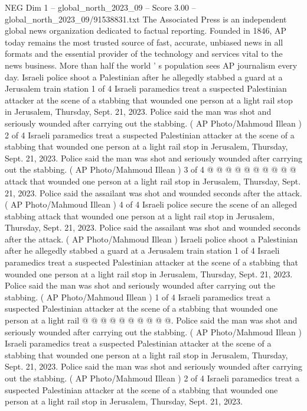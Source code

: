 \begin{textsample}{NEG Dim 1 – global\_north\_2023\_09 – Score 3.00 – global\_north\_2023\_09/91538831.txt}  \label{ex:f1_neg_346}
The Associated Press is an independent global news organization dedicated to factual reporting.
Founded in 1846, AP today remains the most trusted source of fast, accurate, unbiased news in all formats and the essential provider of the technology and services vital to the news business.
More than half the world ' s population sees AP journalism every day.
Israeli police shoot a Palestinian after he allegedly stabbed a guard at a Jerusalem train station 1 of 4 Israeli paramedics treat a suspected Palestinian attacker at the scene of a stabbing that wounded one person at a light rail stop in Jerusalem, Thursday, Sept. 21, 2023.
Police said the man was shot and seriously wounded after carrying out the stabbing. ( AP Photo/Mahmoud Illean ) 2 of 4 Israeli paramedics treat a suspected Palestinian attacker at the scene of a stabbing that wounded one person at a light rail stop in Jerusalem, Thursday, Sept. 21, 2023.
Police said the man was shot and seriously wounded after carrying out the stabbing. ( AP Photo/Mahmoud Illean ) 3 of 4 @ @ @ @ @ @ @ @ @ @ attack that wounded one person at a light rail stop in Jerusalem, Thursday, Sept. 21, 2023.
Police said the assailant was shot and wounded seconds after the attack. ( AP Photo/Mahmoud Illean ) 4 of 4 Israeli police secure the scene of an alleged stabbing attack that wounded one person at a light rail stop in Jerusalem, Thursday, Sept. 21, 2023.
Police said the assailant was shot and wounded seconds after the attack. ( AP Photo/Mahmoud Illean ) Israeli police shoot a Palestinian after he allegedly stabbed a guard at a Jerusalem train station 1 of 4 Israeli paramedics treat a suspected Palestinian attacker at the scene of a stabbing that wounded one person at a light rail stop in Jerusalem, Thursday, Sept. 21, 2023.
Police said the man was shot and seriously wounded after carrying out the stabbing. ( AP Photo/Mahmoud Illean ) 1 of 4 Israeli paramedics treat a suspected Palestinian attacker at the scene of a stabbing that wounded one person at a light rail @ @ @ @ @ @ @ @ @ @.
Police said the man was shot and seriously wounded after carrying out the stabbing. ( AP Photo/Mahmoud Illean ) Israeli paramedics treat a suspected Palestinian attacker at the scene of a stabbing that wounded one person at a light rail stop in Jerusalem, Thursday, Sept. 21, 2023.
Police said the man was shot and seriously wounded after carrying out the stabbing. ( AP Photo/Mahmoud Illean ) 2 of 4 Israeli paramedics treat a suspected Palestinian attacker at the scene of a stabbing that wounded one person at a light rail stop in Jerusalem, Thursday, Sept. 21, 2023.

\end{textsample}
